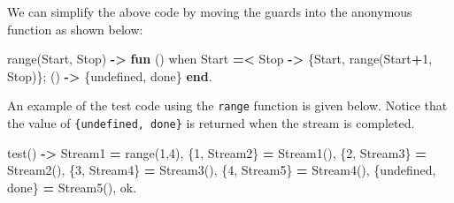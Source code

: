 \documentclass[
]{book}
\newenvironment{Shaded}{\begin{snugshade}}{\end{snugshade}}
\newcommand{\CharTok}[1]{\textcolor[rgb]{0.31,0.60,0.02}{#1}}
\newcommand{\DecValTok}[1]{\textcolor[rgb]{0.00,0.00,0.81}{#1}}
\newcommand{\FunctionTok}[1]{\textcolor[rgb]{0.00,0.00,0.00}{#1}}
\newcommand{\KeywordTok}[1]{\textcolor[rgb]{0.13,0.29,0.53}{\textbf{#1}}}
\newcommand{\OperatorTok}[1]{\textcolor[rgb]{0.81,0.36,0.00}{\textbf{#1}}}
\newcommand{\VariableTok}[1]{\textcolor[rgb]{0.00,0.00,0.00}{#1}}
\begin{document}
We can simplify the above code by moving the guards into the anonymous function as shown below:

\begin{Shaded}
\begin{Highlighting}[]
\FunctionTok{range(}\VariableTok{Start}\FunctionTok{,} \VariableTok{Stop}\FunctionTok{)} \OperatorTok{{-}\textgreater{}}
    \KeywordTok{fun} \FunctionTok{()} \CharTok{when} \VariableTok{Start} \OperatorTok{=\textless{}} \VariableTok{Stop} \OperatorTok{{-}\textgreater{}} \FunctionTok{\{}\VariableTok{Start}\FunctionTok{,} \FunctionTok{range(}\VariableTok{Start}\OperatorTok{+}\DecValTok{1}\FunctionTok{,} \VariableTok{Stop}\FunctionTok{)\};}
        \FunctionTok{()} \OperatorTok{{-}\textgreater{}} \FunctionTok{\{}\CharTok{undefined}\FunctionTok{,} \CharTok{done}\FunctionTok{\}} \KeywordTok{end}\FunctionTok{.}
\end{Highlighting}
\end{Shaded}

An example of the test code using the \texttt{range} function is given below. Notice that the value of \texttt{\{undefined,\ done\}} is returned when the stream is completed.

\begin{Shaded}
\begin{Highlighting}[]
\FunctionTok{test()} \OperatorTok{{-}\textgreater{}}
    \VariableTok{Stream1} \OperatorTok{=} \FunctionTok{range(}\DecValTok{1}\FunctionTok{,}\DecValTok{4}\FunctionTok{),}
    \FunctionTok{\{}\DecValTok{1}\FunctionTok{,} \VariableTok{Stream2}\FunctionTok{\}} \OperatorTok{=} \VariableTok{Stream1}\FunctionTok{(),}
    \FunctionTok{\{}\DecValTok{2}\FunctionTok{,} \VariableTok{Stream3}\FunctionTok{\}} \OperatorTok{=} \VariableTok{Stream2}\FunctionTok{(),}
    \FunctionTok{\{}\DecValTok{3}\FunctionTok{,} \VariableTok{Stream4}\FunctionTok{\}} \OperatorTok{=} \VariableTok{Stream3}\FunctionTok{(),}
    \FunctionTok{\{}\DecValTok{4}\FunctionTok{,} \VariableTok{Stream5}\FunctionTok{\}} \OperatorTok{=} \VariableTok{Stream4}\FunctionTok{(),}
    \FunctionTok{\{}\CharTok{undefined}\FunctionTok{,} \CharTok{done}\FunctionTok{\}} \OperatorTok{=} \VariableTok{Stream5}\FunctionTok{(),}
    \CharTok{ok}\FunctionTok{.}
\end{Highlighting}
\end{Shaded}
\end{document}
